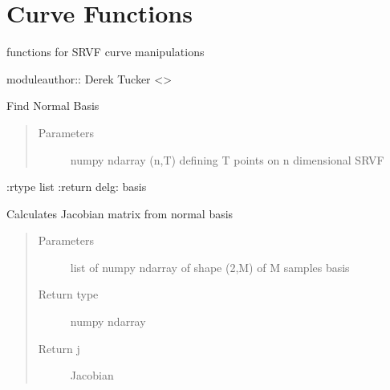 \documentclass[letterpaper,10pt,english]{sphinxmanual}
\begin{document}
\chapter{Curve Functions}
\label{\detokenize{curve_functions:module-curve_functions}}\label{\detokenize{curve_functions:curve-functions}}\label{\detokenize{curve_functions::doc}}
functions for SRVF curve manipulations

moduleauthor:: Derek Tucker \textless{}\textgreater{}

\begin{fulllineitems}
\label{\detokenize{curve_functions:curve_functions.Basis_Normal_A}}
Find Normal Basis
\begin{quote}\begin{description}
\item[{Parameters}] \leavevmode
{} \textendash{} numpy ndarray (n,T) defining T points on n dimensional SRVF

\end{description}\end{quote}

:rtype list
:return delg: basis

\end{fulllineitems}


\begin{fulllineitems}
\label{\detokenize{curve_functions:curve_functions.calc_j}}
Calculates Jacobian matrix from normal basis
\begin{quote}\begin{description}
\item[{Parameters}] \leavevmode
{} \textendash{} list of numpy ndarray of shape (2,M) of M samples basis

\item[{Return type}] \leavevmode
numpy ndarray

\item[{Return j}] \leavevmode
Jacobian

\end{description}\end{quote}

\end{fulllineitems}
\end{document}

